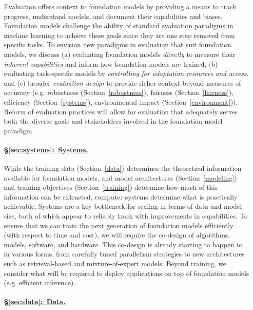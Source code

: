 Evaluation offers context to foundation models by providing a means to track progress, understand models, and document their capabilities and biases. Foundation models challenge the ability of standard evaluation paradigms in machine learning to achieve these goals since they are one step removed from specific tasks. To envision new paradigms in evaluation that suit foundation models, we discuss (a) evaluating foundation models \textit{directly} to measure their \textit{inherent capabilities} and inform how foundation models are trained, (b) evaluating task-specific models by \textit{controlling for adaptation resources and access}, and (c) broader \textit{evaluation design} to provide richer context beyond measures of accuracy (e.g. robustness (Section~\ref{robustness}), fairness (Section~\ref{fairness}), efficiency (Section~\ref{systems}), environmental impact (Section~\ref{environment})). 
Reform of evaluation practices will allow for evaluation that adequately serves both the diverse goals and stakeholders involved in the foundation model paradigm.

\paragraph{\hyperref[sec:systems]{§\ref{sec:systems}:~Systems.}}

While the training data (Section~\ref{data}) determines the theoretical information available for foundation models, and model architectures (Section~\ref{modeling}) and training objectives (Section~\ref{training}) determine how much of this information can be extracted, computer systems determine what is practically achievable. Systems are a key bottleneck for scaling in terms of data and model size, both of which appear to reliably track with improvements in capabilities. To ensure that we can train the next generation of foundation models efficiently (with respect to time and cost), we will require the co-design of algorithms, models, software, and hardware. This co-design is already starting to happen to in various forms, from carefully tuned parallelism strategies to new architectures such as retrieval-based and mixture-of-expert models. Beyond training, we consider what will be required to deploy applications on top of foundation models (e.g. efficient inference).

\paragraph{\hyperref[sec:data]{§\ref{sec:data}:~Data.}}

